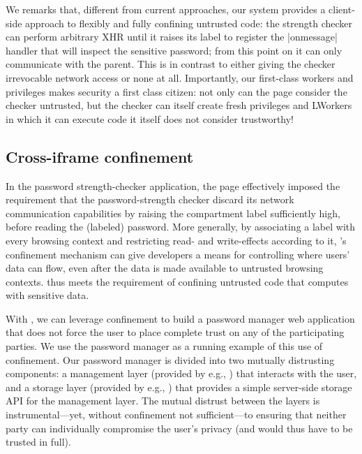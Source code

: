 We remarks that, different from current approaches, our system
provides a client-side approach to flexibly and fully confining
untrusted code:
%
the strength checker can perform arbitrary XHR until it raises its
label to register the \js|onmessage| handler that will inspect the
sensitive password; from this point on it can only communicate with
the parent.
%
This is in contrast to either giving the checker irrevocable network
access or none at all.
%
Importantly, our first-class workers and privileges makes security a
first class citizen: not only can the page consider the checker
untrusted, but the checker can itself create fresh privileges and 
LWorkers in which it can execute code it itself does not consider
trustworthy!

\subsection{Cross-iframe confinement}
\label{sec:system:iframe}

In the password strength-checker application, the 
page effectively imposed the requirement that the password-strength
checker discard its network communication capabilities by raising the
compartment label sufficiently high, before reading the (labeled)
password.
%
More generally, by associating a label with every browsing context and
restricting read- and write-effects according to it, \sys{}'s
confinement mechanism can give developers a means for controlling
where users' data can flow, even after the data is made available to
untrusted browsing contexts. \sys{} thus meets the requirement of
confining untrusted code that computes with sensitive data.

%
With \sys{}, we can leverage confinement to build a password manager
web application that does not force the user to place complete trust on 
any of the participating parties. We use the password manager as a
running example of this use of confinement.
%
Our password manager is divided into two mutually distrusting
components: a management layer (provided by e.g., )
that interacts with the user, 
and a storage layer (provided by e.g., ) that provides a
simple
server-side storage API for the
management layer.
%
The mutual distrust between the layers is instrumental---yet, without
confinement not sufficient---to ensuring that neither party can
individually compromise the user's privacy (and would thus have to be
trusted in full).
%

